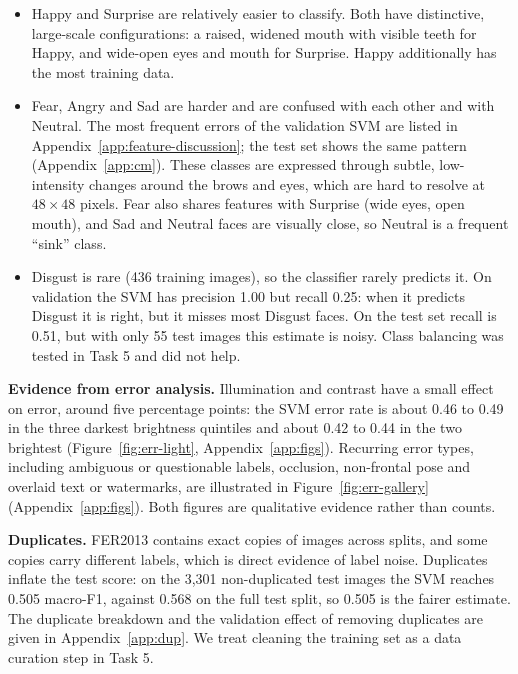 \begin{itemize}
\item Happy and Surprise are relatively easier to classify. Both have distinctive, large-scale configurations: a raised, widened mouth with visible teeth for Happy, and wide-open eyes and mouth for Surprise. Happy additionally has the most training data.

\item Fear, Angry and Sad are harder and are confused with each other and with Neutral. The most frequent errors of the validation SVM are listed in Appendix~\ref{app:feature-discussion}; the test set shows the same pattern (Appendix~\ref{app:cm}). These classes are expressed through subtle, low-intensity changes around the brows and eyes, which are hard to resolve at $48\times48$ pixels. Fear also shares features with Surprise (wide eyes, open mouth), and Sad and Neutral faces are visually close, so Neutral is a frequent ``sink'' class.

\item Disgust is rare (436 training images), so the classifier rarely predicts it. On validation the SVM has precision 1.00 but recall 0.25: when it predicts Disgust it is right, but it misses most Disgust faces. On the test set recall is 0.51, but with only 55 test images this estimate is noisy. Class balancing was tested in Task 5 and did not help.
\end{itemize}

\textbf{Evidence from error analysis.} Illumination and contrast have a small effect on error, around five percentage points: the SVM error rate is about 0.46 to 0.49 in the three darkest brightness quintiles and about 0.42 to 0.44 in the two brightest (Figure~\ref{fig:err-light}, Appendix~\ref{app:figs}). Recurring error types, including ambiguous or questionable labels, occlusion, non-frontal pose and overlaid text or watermarks, are illustrated in Figure~\ref{fig:err-gallery} (Appendix~\ref{app:figs}). Both figures are qualitative evidence rather than counts.

\textbf{Duplicates.} FER2013 contains exact copies of images across splits, and some copies carry different labels, which is direct evidence of label noise. Duplicates inflate the test score: on the 3,301 non-duplicated test images the SVM reaches 0.505 macro-F1, against 0.568 on the full test split, so 0.505 is the fairer estimate. The duplicate breakdown and the validation effect of removing duplicates are given in Appendix~\ref{app:dup}. We treat cleaning the training set as a data curation step in Task 5.

